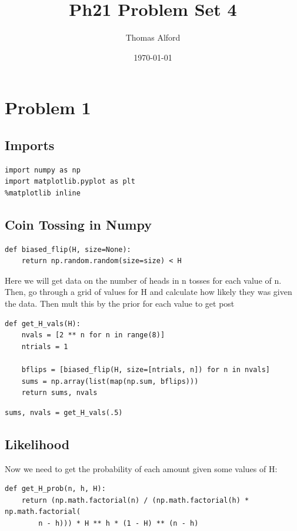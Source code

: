 \documentclass[11pt]{article}
\author{Thomas Alford}
\date{\today}
\title{Ph21 Problem Set 4}
\begin{document}
\maketitle
\section*{Problem 1}
\label{sec-1}
\subsection*{Imports}
\label{sec-1-1}
\begin{verbatim}
import numpy as np
import matplotlib.pyplot as plt
%matplotlib inline
\end{verbatim}

\subsection*{Coin Tossing in Numpy}
\label{sec-1-2}
\begin{verbatim}
def biased_flip(H, size=None):
    return np.random.random(size=size) < H
\end{verbatim}


Here we will get data on the number of heads in n tosses for each value of
n. Then, go through a grid of values for H and calculate how likely they was
given the data. Then mult this by the prior for each value to get post

\begin{verbatim}
def get_H_vals(H):
    nvals = [2 ** n for n in range(8)]
    ntrials = 1

    bflips = [biased_flip(H, size=[ntrials, n]) for n in nvals]
    sums = np.array(list(map(np.sum, bflips)))
    return sums, nvals
\end{verbatim}


\begin{verbatim}
sums, nvals = get_H_vals(.5)
\end{verbatim}

\subsection*{Likelihood}
\label{sec-1-3}
Now we need to get the probability of each amount given some values of H:

\begin{verbatim}
def get_H_prob(n, h, H):
    return (np.math.factorial(n) / (np.math.factorial(h) * np.math.factorial(
        n - h))) * H ** h * (1 - H) ** (n - h)
\end{verbatim}
\end{document}
